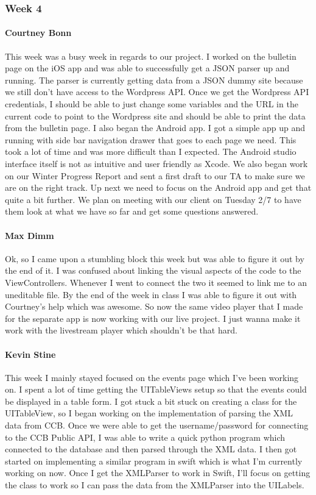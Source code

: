		\subsubsection{Week 4}

			\paragraph{Courtney Bonn}
			This week was a busy week in regards to our project. I worked on the bulletin page on the iOS app and was able to successfully get a JSON parser up and running. The parser is currently getting data from a JSON dummy site because we still don't have access to the Wordpress API. Once we get the Wordpress API credentials, I should be able to just change some variables and the URL in the current code to point to the Wordpress site and should be able to print the data from the bulletin page. I also began the Android app. I got a simple app up and running with side bar navigation drawer that goes to each page we need. This took a lot of time and was more difficult than I expected. The Android studio interface itself is not as intuitive and user friendly as Xcode. We also began work on our Winter Progress Report and sent a first draft to our TA to make sure we are on the right track. Up next we need to focus on the Android app and get that quite a bit further. We plan on meeting with our client on Tuesday 2/7 to have them look at what we have so far and get some questions answered.

			\paragraph{Max Dimm}
			Ok, so I came upon a stumbling block this week but was able to figure it out by the end of it. I was confused about linking the visual aspects of the code to the ViewControllers. Whenever I went to connect the two it seemed to link me to an uneditable file. By the end of the week in class I was able to figure it out with Courtney's help which was awesome. So now the same video player that I made for the separate app is now working with our live project. I just wanna make it work with the livestream player which shouldn't be that hard.

			\paragraph{Kevin Stine}
			This week I mainly stayed focused on the events page which I've been working on. I spent a lot of time getting the UITableViews setup so that the events could be displayed in a table form. I got stuck a bit stuck on creating a class for the UITableView, so I began working on the implementation of parsing the XML data from CCB. Once we were able to get the username/password for connecting to the CCB Public API, I was able to write a quick python program which connected to the database and then parsed through the XML data. I then got started on implementing a similar program in swift which is what I'm currently working on now. Once I get the XMLParser to work in Swift, I'll focus on getting the class to work so I can pass the data from the XMLParser into the UILabels.

